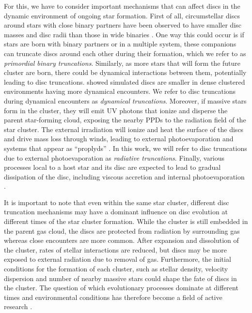 \documentclass[fleqn,usenatbib]{mnras}
\begin{document}
For this, we have to consider important mechanisms that can affect discs in the dynamic environment of ongoing star formation. First of all, circumstellar discs around stars with close binary partners have been observed to have smaller disc masses and disc radii than those in wide binaries \citep{Offner2022arXiv220310066O, Zurlo2023EPJP..138..411Z}. One way this could occur is if stars are born with binary partners or in a multiple system, these companions can truncate discs around each other during their formation, which we refer to as \emph{primordial binary truncations}.  Similarly, as more stars that will form the future cluster are born, there could be dynamical interactions between them, potentially leading to disc truncations. \cite{Vincke2016ApJ...828...48V} showed simulated discs are smaller in dense clustered environments having more dynamical encounters. We refer to disc truncations during dynamical encounters as \emph{dynamical truncations}. Moreover, if massive stars form in the cluster, they will emit UV photons that ionize and disperse the parent star-forming cloud, exposing the nearby PPDs to the radiation field of the star cluster. The external irradiation will ionize and heat the surface of the discs and drive mass loss through winds, leading to external photoevaporation and systems that appear as ``proplyds'' \citep[e.g.,][]{Johnstone1998ApJ...499..758J}. In this work, we will refer to disc truncations due to external photoevaporation as \emph{radiative truncations}. Finally, various processes local to a host star and its disc are expected to lead to gradual dissipation of the disc, including viscous accretion and internal photoevaporation \citep[e.g.,][]{Gorti2009ApJ...690.1539G}. 

It is important to note that even within the same star cluster, different disc truncation mechanisms may have a dominant influence on disc evolution at different times of the star cluster formation. While the cluster is still embedded in the parent gas cloud, the discs are protected from radiation by surrounding gas whereas close encounters are more common. After expansion and dissolution of the cluster, rates of stellar interactions are reduced, but discs may be more exposed to external radiation due to removal of gas. Furthermore, the initial conditions for the formation of each cluster, such as stellar density, velocity dispersion and number of nearby massive stars could shape the fate of discs in the cluster. The question of which evolutionary processes dominate at different times and environmental conditions has therefore become a field of active research \citep[see, e.g., review by][]{Reiter2022arXiv220903889R}.
\end{document}
